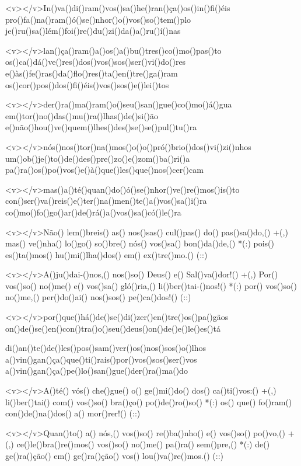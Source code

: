 <v></v>In()va()di()ram()vos()sa()he()ran()ça()os()in()fi()éis
pro()fa()na()ram()ó()se()nhor()o()vos()so()tem()plo
je()ru()sa()lém()foi()re()du()zi()da()a()ru()í()nas

<v></v>lan()ça()ram()a()os()a()bu()tres()co()mo()pas()to
os()ca()dá()ve()res()dos()vos()sos()ser()vi()do()res
e()às()fe()ras()da()flo()res()ta()en()tre()ga()ram
os()cor()pos()dos()fi()éis()vos()sos()e()lei()tos

<v></v>der()ra()ma()ram()o()seu()san()gue()co()mo()á()gua
em()tor()no()das()mu()ra()lhas()de()si()ão
e()não()hou()ve()quem()lhes()des()se()se()pul()tu()ra

<v></v>nós()nos()tor()na()mos()o()o()pró()brio()dos()vi()zi()nhos
um()ob()je()to()de()des()pre()zo()e()zom()ba()ri()a
pa()ra()os()po()vos()e()à()que()les()que()nos()cer()cam

<v></v>mas()a()té()quan()do()ó()se()nhor()ve()re()mos()is()to
con()ser()va()reis()e()ter()na()men()te()a()vos()sa()i()ra
co()mo()fo()go()ar()de()rá()a()vos()sa()có()le()ra

<v></v>Não() lem()breis() as() nos()sas() cul()pas() do() pas()sa()do,() +(,)
mas() ve()nha() lo()go() so()bre() nós() vos()sa() bon()da()de,() *(:)
pois() es()ta()mos() hu()mi()lha()dos() em() ex()tre()mo.() (::)

<v></v>A()ju()dai-()nos,() nos()so() Deus() e() Sal()va()dor!() +(,)
Por() vos()so() no()me() e() vos()sa() gló()ria,() li()ber()tai-()nos!() *(:)
por() vos()so() no()me,() per()do()ai() nos()sos() pe()ca()dos!() (::)

<v></v>por()que()há()de()se()di()zer()en()tre()os()pa()gãos
on()de()se()en()con()tra()o()seu()deus()on()de()e()le()es()tá

di()an()te()de()les()pos()sam()ver()os()nos()sos()o()lhos
a()vin()gan()ça()que()ti()rais()por()vos()sos()ser()vos
a()vin()gan()ça()pe()lo()san()gue()der()ra()ma()do

<v></v>A()té() vós() che()gue() o() ge()mi()do() dos() ca()ti()vos:() +(,)
li()ber()tai() com() vos()so() bra()ço() po()de()ro()so() *(:)
os() que() fo()ram() con()de()na()dos() a() mor()rer!() (::)

<v></v>Quan()to() a() nós,() vos()so() re()ba()nho() e() vos()so() po()vo,() +(,)
ce()le()bra()re()mos() vos()so() no()me() pa()ra() sem()pre,() *(:)
de() ge()ra()ção() em() ge()ra()ção() vos() lou()va()re()mos.() (::)